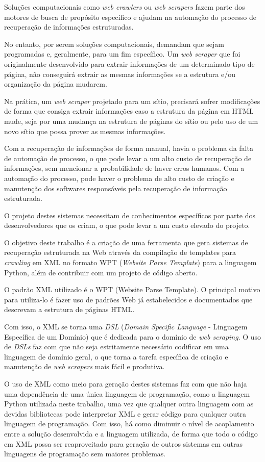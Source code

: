 Soluções computacionais como \emph{web crawlers} ou \emph{web scrapers} fazem parte dos motores de busca de propósito específico  e ajudam na automação do processo de recuperação de informações estruturadas. 

No entanto, por serem soluções computacionais, demandam que sejam programadas e, geralmente, para um fim específico. Um \emph{web scraper} que foi originalmente desenvolvido para extrair informações de um determinado tipo de página, não conseguirá extrair as mesmas informações se a estrutura e/ou organização da página mudarem.

Na prática, um \emph{web scraper} projetado para um sítio, precisará sofrer modificações de forma que consiga extrair informações caso a estrutura da página em HTML mude, seja por uma mudança na estrutura de páginas do sítio ou pelo uso de um novo sítio que possa prover as mesmas informações.

Com a recuperação de informações de forma manual, havia o problema da falta de automação de processo, o que pode levar a um alto custo  de recuperação de informações, sem mencionar a probabilidade de haver erros humanos. Com a automação do processo, pode haver o problema de alto custo de criação e manutenção dos softwares responsáveis pela recuperação de informação estruturada.


O projeto destes sistemas necessitam de conhecimentos específicos por parte dos desenvolvedores que os criam, o que pode levar a um custo elevado do projeto.

O objetivo deste trabalho é a criação de uma ferramenta que gera sistemas de recuperação estruturada na Web através da compilação de templates para \emph{crawling} em XML no formato WPT (\emph{Website Parse Template}) para a linguagem Python, além de contribuir com um projeto de código aberto.

O padrão XML utilizado é o WPT (Website Parse Template)\cite{wpt}. O principal motivo para utiliza-lo é fazer uso de padrões Web já estabelecidos e documentados que descrevam a estrutura de páginas HTML.

Com isso, o XML se torna uma \emph{DSL} (\emph{Domain Specific Language} - Linguagem Específica de um Domínio) que é dedicada para o domínio de \emph{web scraping}. O uso de \emph{DSLs} faz com que não seja estritamente necessário codificar em uma linguagem de domínio geral, o que torna a tarefa específica de criação e manutenção de \emph{web scrapers} mais fácil e produtiva.

O uso de XML como meio para geração destes sistemas faz com que não haja uma dependência de uma única linguagem de programação, como a linguagem Python utilizada neste trabalho, uma vez que qualquer outra linguagem com as devidas bibliotecas pode interpretar XML e gerar código para qualquer outra linguagem de programação. Com isso, há como diminuir o nível de acoplamento entre a solução desenvolvida e a linguagem utilizada, de forma que todo o código em XML possa ser reaproveitado para geração de outros sistemas em outras linguagens de programação sem maiores problemas.

